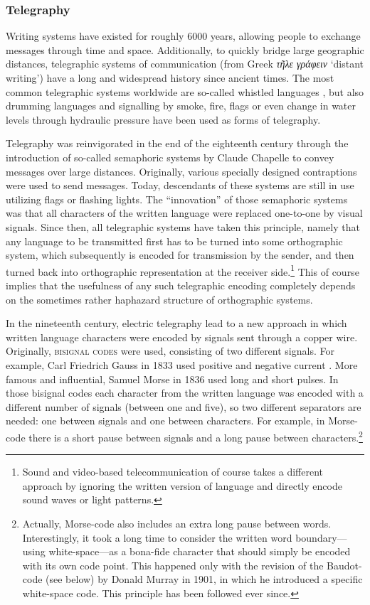 \subsubsection*{Telegraphy}

Writing systems have existed for roughly 6000 years, allowing people to exchange
messages through time and space. Additionally, to quickly bridge large geographic
distances, telegraphic systems of communication (from Greek \emph{τῆλε
γράφειν} `distant writing') have a long and widespread history since ancient
times. The most common telegraphic systems worldwide are so-called whistled
languages \citep{Meyer2015}, but also drumming languages \citep{Meyer2012} and
signalling by smoke, fire, flags or even change in water levels through
hydraulic pressure have been used as forms of telegraphy. 

Telegraphy was reinvigorated in the end of the eighteenth century through the
introduction of so-called semaphoric systems by Claude Chapelle to convey
messages over large distances. Originally, various specially designed
contraptions were used to send messages. Today, descendants of these systems
are still in use utilizing flags or flashing lights. The ``innovation'' of those
semaphoric systems was that all characters of the written language were replaced
one-to-one by visual signals. Since then, all telegraphic systems have taken
this principle, namely that any language to be transmitted first has to be
turned into some orthographic system, which subsequently is encoded for
transmission by the sender, and then turned back into orthographic
representation at the receiver side.\footnote{Sound and video-based
telecommunication of course takes a different approach by ignoring the written
version of language and directly encode sound waves or light patterns.} This of
course implies that the usefulness of any such telegraphic encoding completely
depends on the sometimes rather haphazard structure of orthographic systems.

In the nineteenth century, electric telegraphy lead to a new approach
in which written language characters were encoded by signals sent through a
copper wire. Originally, \textsc{bisignal codes} were used, consisting of two
different signals. For example, Carl Friedrich Gauss in 1833 used positive and
negative current \citep[282]{Mania2008}. More famous and influential, Samuel
Morse in 1836 used long and short pulses. In those bisignal codes each character
from the written language was encoded with a different number of signals
(between one and five), so two different separators are needed: one between
signals and one between characters. For example, in Morse-code there is a short
pause between signals and a long pause between characters.\footnote{Actually,
Morse-code also includes an extra long pause between words. Interestingly, it
took a long time to consider the written word boundary---using white-space---as
a bona-fide character that should simply be encoded with its own code point.
This happened only with the revision of the Baudot-code (see below) by Donald
Murray in 1901, in which he introduced a specific white-space code. This
principle has been followed ever since.}

